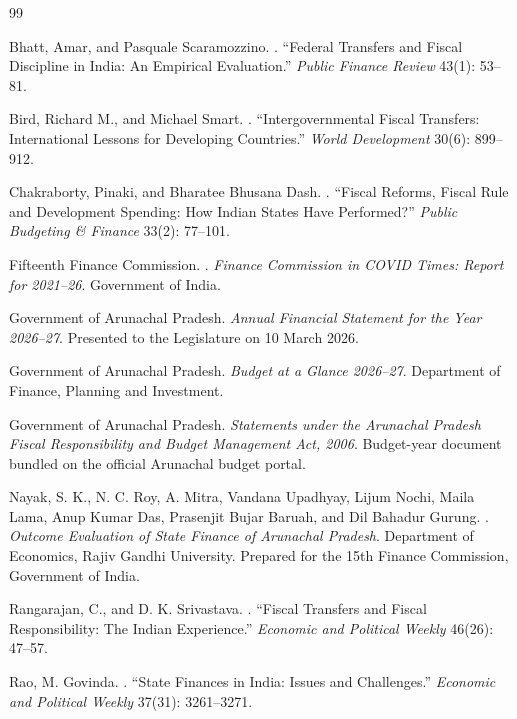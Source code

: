 \documentclass[11pt,a4paper]{article}
\begin{document}
\begin{thebibliography}{99}

Bhatt, Amar, and Pasquale Scaramozzino.
.
\newblock ``Federal Transfers and Fiscal Discipline in India: An Empirical Evaluation.''
\newblock \emph{Public Finance Review} 43(1): 53--81.

Bird, Richard M., and Michael Smart.
.
\newblock ``Intergovernmental Fiscal Transfers: International Lessons for Developing Countries.''
\newblock \emph{World Development} 30(6): 899--912.

Chakraborty, Pinaki, and Bharatee Bhusana Dash.
.
\newblock ``Fiscal Reforms, Fiscal Rule and Development Spending: How Indian States Have Performed?''
\newblock \emph{Public Budgeting \& Finance} 33(2): 77--101.

Fifteenth Finance Commission.
.
\newblock \emph{Finance Commission in COVID Times: Report for 2021--26}.
\newblock Government of India.

Government of Arunachal Pradesh.
\newblock \emph{Annual Financial Statement for the Year 2026--27}.
\newblock Presented to the Legislature on 10 March 2026.

Government of Arunachal Pradesh.
\newblock \emph{Budget at a Glance 2026--27}.
\newblock Department of Finance, Planning and Investment.

Government of Arunachal Pradesh.
\newblock \emph{Statements under the Arunachal Pradesh Fiscal Responsibility and Budget Management Act, 2006}.
\newblock Budget-year document bundled on the official Arunachal budget portal.

Nayak, S. K., N. C. Roy, A. Mitra, Vandana Upadhyay, Lijum Nochi, Maila Lama, Anup Kumar Das, Prasenjit Bujar Baruah, and Dil Bahadur Gurung.
.
\newblock \emph{Outcome Evaluation of State Finance of Arunachal Pradesh}.
\newblock Department of Economics, Rajiv Gandhi University. Prepared for the 15th Finance Commission, Government of India.

Rangarajan, C., and D. K. Srivastava.
.
\newblock ``Fiscal Transfers and Fiscal Responsibility: The Indian Experience.''
\newblock \emph{Economic and Political Weekly} 46(26): 47--57.

Rao, M. Govinda.
.
\newblock ``State Finances in India: Issues and Challenges.''
\newblock \emph{Economic and Political Weekly} 37(31): 3261--3271.


\end{thebibliography}
\end{document}
